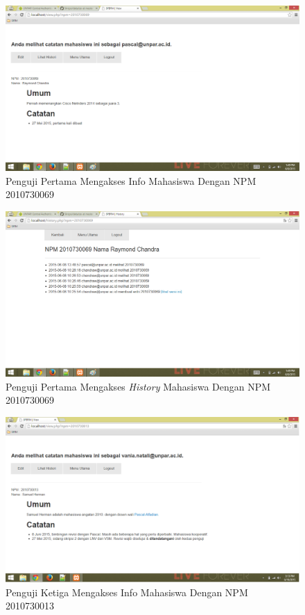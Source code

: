 \begin{figure}[p]
\centering
\includegraphics[scale=0.44]{Gambar/eks12.png}
\caption[Penguji Pertama Mengakses Info Mahasiswa Dengan NPM 2010730069]{Penguji Pertama Mengakses Info Mahasiswa Dengan NPM 2010730069} 
\label{fig:eks12}
\end{figure}

\begin{figure}[p]
\centering
\includegraphics[scale=0.44]{Gambar/eks13.png}
\caption[Penguji Pertama Mengakses {\it History} Mahasiswa Dengan NPM 2010730069]{Penguji Pertama Mengakses {\it History} Mahasiswa Dengan NPM 2010730069} 
\label{fig:eks13}
\end{figure}

\begin{figure}[p]
\centering
\includegraphics[scale=0.44]{Gambar/eks14.png}
\caption[Penguji Ketiga Mengakses Info Mahasiswa Dengan NPM 2010730013]{Penguji Ketiga Mengakses Info Mahasiswa Dengan NPM 2010730013} 
\label{fig:eks14}
\end{figure}

